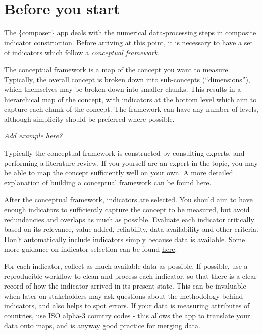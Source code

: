 \documentclass[
  letterpaper,
  DIV=11,
  numbers=noendperiod]{scrreprt}
\begin{document}
\hypertarget{before-you-start}{%
\section{Before you start}\label{before-you-start}}

The \{composer\} app deals with the numerical data-processing steps in
composite indicator construction. Before arriving at this point, it is
necessary to have a set of indicators which follow a \emph{conceptual
framework}.

The conceptual framework is a map of the concept you want to measure.
Typically, the overall concept is broken down into sub-concepts
(``dimensions''), which themselves may be broken down into smaller
chunks. This results in a hierarchical map of the concept, with
indicators at the bottom level which aim to capture each chunk of the
concept. The framework can have any number of levels, although
simplicity should be preferred where possible.

\emph{Add example here?}

Typically the conceptual framework is constructed by consulting experts,
and performing a literature review. If you yourself are an expert in the
topic, you may be able to map the concept sufficiently well on your own.
A more detailed explanation of building a conceptual framework can be
found
\href{https://compositeindicators.com/how-to-build-a-conceptual-framework/}{here}.

After the conceptual framework, indicators are selected. You should aim
to have enough indicators to sufficiently capture the concept to be
measured, but avoid redundancies and overlaps as much as possible.
Evaluate each indicator critically based on its relevance, value added,
reliability, data availability and other criteria. Don't automatically
include indicators simply because data is available. Some more guidance
on indicator selection can be found
\href{https://compositeindicators.com/how-to-select-indicators/}{here}.

For each indicator, collect as much available data as possible. If
possible, use a reproducible workflow to clean and process each
indicator, so that there is a clear record of how the indicator arrived
in its present state. This can be invaluable when later on stakeholders
may ask questions about the methodology behind indicators, and also
helps to spot errors. If your data is measuring attributes of countries,
use \href{https://en.wikipedia.org/wiki/ISO_3166-1_alpha-3}{ISO alpha-3
country codes} - this allows the app to translate your data onto maps,
and is anyway good practice for merging data.
\end{document}
